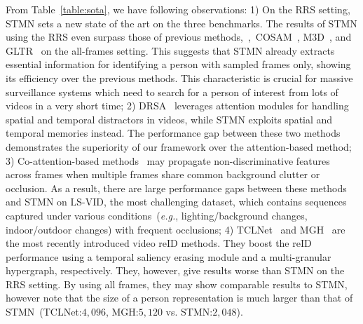 \documentclass[10pt,twocolumn,letterpaper]{article}
\begin{document}
		From Table~\ref{table:sota}, we have following observations: 1) On the RRS setting, STMN sets a new state of the art on the three benchmarks. The results of STMN using the RRS even surpass those of previous methods,~\eg,~COSAM~\cite{subramaniam2019co}, M3D~\cite{li2019multi}, and GLTR~\cite{li2019global} on the all-frames setting. This suggests that STMN already extracts essential information for identifying a person with sampled frames only, showing its efficiency over the previous methods. This characteristic is crucial for massive surveillance systems which need to search for a person of interest from lots of videos in a very short time; 2) DRSA~\cite{li2018diversity} leverages attention modules for handling spatial and temporal distractors in videos, while STMN exploits spatial and temporal memories instead. The performance gap between these two methods demonstrates the superiority of our framework over the attention-based method; 3) Co-attention-based methods~\cite{liu2019spatially,li2019global,yan2020learning} may propagate non-discriminative features across frames when multiple frames share common background clutter or occlusion. As a result, there are large performance gaps between these methods and STMN on LS-VID, the most challenging dataset, which contains sequences captured under various conditions~(\emph{e.g.}, lighting/background changes, indoor/outdoor changes) with frequent occlusions; 4) TCLNet~\cite{hou2020temporal} and MGH~\cite{yan2020learning} are the most recently introduced video reID methods. They boost the reID performance using a temporal saliency erasing module and a multi-granular hypergraph, respectively. They, however, give results worse than STMN on the RRS setting. By using all frames, they may show comparable results to STMN, however note that the size of a person representation is much larger than that of STMN~(TCLNet:$4,096$, MGH:$5,120$ vs. STMN:$2,048$).
		
\end{document}
